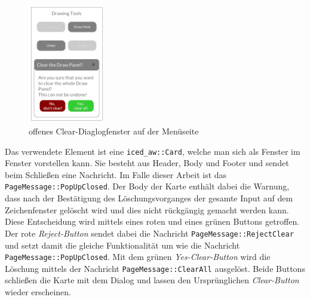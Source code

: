 \begin{figure}
    \centering
    \includegraphics[width=0.3\textwidth]{bilder/clear_dialog.png}
    \caption[Clear-Dialogfenster]{offenes Clear-Diaglogfenster auf der Menüseite}
\end{figure}

Das verwendete Element ist eine \lstinline{iced_aw::Card}, welche man sich als Fenster im Fenster vorstellen kann. Sie besteht aus Header, Body und Footer und sendet beim Schließen eine Nachricht. 
Im Falle dieser Arbeit ist das \lstinline{PageMessage::PopUpClosed}. Der Body der Karte enthält dabei die Warnung, dass nach der Bestätigung des Löschungsvorganges der gesamte Input auf dem Zeichenfenster gelöscht wird und dies nicht rückgängig gemacht werden kann.
Diese Entscheidung wird mittels eines roten und eines grünen Buttons getroffen. Der rote \emph{Reject-Button} sendet dabei die Nachricht \lstinline{PageMessage::RejectClear} und setzt damit die gleiche Funktionalität um wie die Nachricht \lstinline{PageMessage::PopUpClosed}.
Mit dem grünen \emph{Yes-Clear-Button} wird die Löschung mittels der Nachricht \lstinline{PageMessage::ClearAll} ausgelöst. Beide Buttons schließen die Karte mit dem Dialog und lassen den Ursprünglichen \emph{Clear-Button} wieder erscheinen. 
\linebreak 

